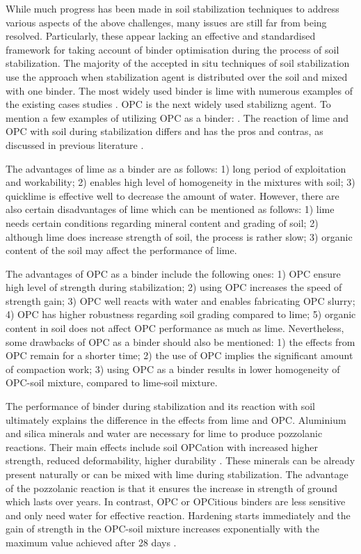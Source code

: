 \documentclass[eprint,
]{actapoly}
\begin{document}
While much progress has been made in soil stabilization techniques to address various aspects of the above challenges, many issues are still far from being resolved. Particularly, these appear lacking an effective and standardised framework for taking account of binder optimisation during the process of soil stabilization. The majority of the accepted in situ techniques of soil stabilization use the approach when stabilization agent is distributed over the soil and mixed with one binder. The most widely used binder is lime with numerous examples of the existing cases studies \citep{Greaves,RaoThyagaraj,Rogersetal2000,ATTOHOKINE1995283,ROBIN2014211,Harichane,GlendinningRogers}. OPC is the next widely used stabilizng agent. To mention a few examples of utilizing OPC as a binder: \citep{Prusinski,Bhattacharjaetal2003,Lindh202201,Lindh202102,KULKARNI2022125363}. The reaction of lime and OPC with soil during stabilization differs and has the pros and contras, as discussed in previous literature \citep{Mahedi,KOLIAS2005301,BARMAN20221319,Lindhetal2000,Chewetal2004,KOOHMISHI2022100726}. 

The advantages of lime as a binder are as follows: 1) long period of exploitation and workability; 2) enables high level of homogeneity in the mixtures with soil; 3) quicklime is effective well to decrease the amount of water. However, there are also certain disadvantages of lime which can be mentioned as follows: 1) lime needs certain conditions regarding mineral content and grading of soil; 2) although lime does increase strength of soil, the process is rather slow; 3) organic content of the soil may affect the performance of lime.

The advantages of OPC as a binder include the following ones: 1) OPC ensure high level of strength during stabilization; 2) using OPC increases the speed of strength gain; 3) OPC well reacts with water and enables fabricating OPC slurry; 4) OPC has higher robustness regarding soil grading compared to lime; 5) organic content in soil does not affect OPC performance as much as lime. Nevertheless, some drawbacks of OPC as a binder should also be mentioned: 1) the effects from OPC remain for a shorter time; 2) the use of OPC implies the significant amount of compaction work; 3) using OPC as a binder results in lower homogeneity of OPC-soil mixture, compared to lime-soil mixture.

The performance of binder during stabilization and its reaction with soil ultimately explains the difference in the effects from lime and OPC. Aluminium and silica minerals and water are necessary for lime  to produce pozzolanic reactions. Their main effects include soil OPCation with increased higher strength, reduced deformability, higher durability \citep{DISANTE2022100742,AkulaLittle,1988240,VITALE201736}. These minerals can be already present naturally or can be mixed with lime during stabilization. The advantage of the pozzolanic reaction is that it ensures the increase in strength of ground which lasts over years. In contrast, OPC or OPCitious binders are less sensitive and only need water for effective reaction. Hardening starts immediately and the gain of strength in the OPC-soil mixture increases exponentially with the maximum value achieved after 28 days \citep{Bell1995,Makusa}. 
\end{document}
